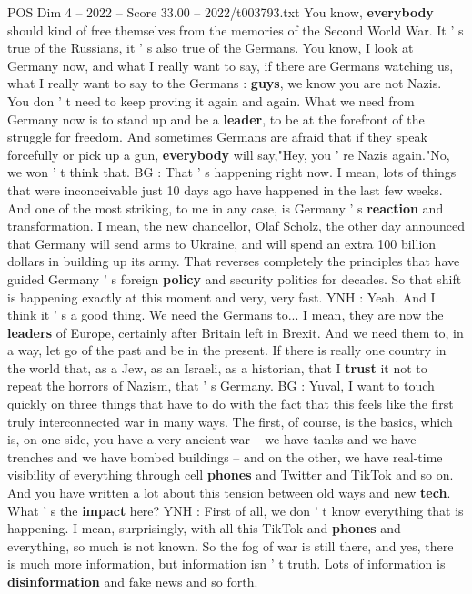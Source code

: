 \begin{textsample}{POS Dim 4 – 2022 – Score 33.00 – 2022/t003793.txt}
You know, \textbf{everybody} should kind of free themselves from the memories of the Second World War.
It ' s true of the Russians, it ' s also true of the Germans.
You know, I look at Germany now, and what I really want to say, if there are Germans watching us, what I really want to say to the Germans : \textbf{guys}, we know you are not Nazis.
You don ' t need to keep proving it again and again.
What we need from Germany now is to stand up and be a \textbf{leader}, to be at the forefront of the struggle for freedom.
And sometimes Germans are afraid that if they speak forcefully or pick up a gun, \textbf{everybody} will say,"Hey, you ' re Nazis again."No, we won ' t think that.
BG : That ' s happening right now.
I mean, lots of things that were inconceivable just 10 days ago have happened in the last few weeks.
And one of the most striking, to me in any case, is Germany ' s \textbf{reaction} and transformation.
I mean, the new chancellor, Olaf Scholz, the other day announced that Germany will send arms to Ukraine, and will spend an extra 100 billion dollars in building up its army.
That reverses completely the principles that have guided Germany ' s foreign \textbf{policy} and security politics for decades.
So that shift is happening exactly at this moment and very, very fast.
YNH : Yeah.
And I think it ' s a good thing.
We need the Germans to...
I mean, they are now the \textbf{leaders} of Europe, certainly after Britain left in Brexit.
And we need them to, in a way, let go of the past and be in the present.
If there is really one country in the world that, as a Jew, as an Israeli, as a historian, that I \textbf{trust} it not to repeat the horrors of Nazism, that ' s Germany.
BG : Yuval, I want to touch quickly on three things that have to do with the fact that this feels like the first truly interconnected war in many ways.
The first, of course, is the basics, which is, on one side, you have a very ancient war -- we have tanks and we have trenches and we have bombed buildings -- and on the other, we have real-time visibility of everything through cell \textbf{phones} and Twitter and TikTok and so on.
And you have written a lot about this tension between old ways and new \textbf{tech}.
What ' s the \textbf{impact} here?
YNH : First of all, we don ' t know everything that is happening.
I mean, surprisingly, with all this TikTok and \textbf{phones} and everything, so much is not known.
So the fog of war is still there, and yes, there is much more information, but information isn ' t truth.
Lots of information is \textbf{disinformation} and fake news and so forth.

\end{textsample}
